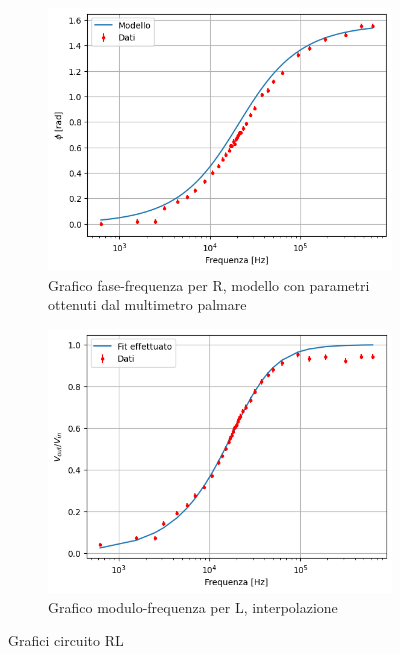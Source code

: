 \documentclass[letterpaper,12pt]{article}
\begin{document}
\begin{figure}[p]
    \begin{subfigure}[b]{0.45\textwidth}
        \centering
        \includegraphics[width=\textwidth]{RL_R_fase_modello.png}
        \caption{Grafico fase-frequenza per R, modello con parametri ottenuti dal multimetro palmare}
        \label{fig:RL_R_fase_modello}
    \end{subfigure}
    \hfill
    \begin{subfigure}[b]{0.45\textwidth}
        \centering
        \includegraphics[width=\textwidth]{RL_L_modulo.png}
        \caption{Grafico modulo-frequenza per L, interpolazione}
        \label{fig:RL_L_modulo}
    \end{subfigure}
    \caption{Grafici circuito RL}
    \label{fig:multi1}
\end{figure}
\end{document}
